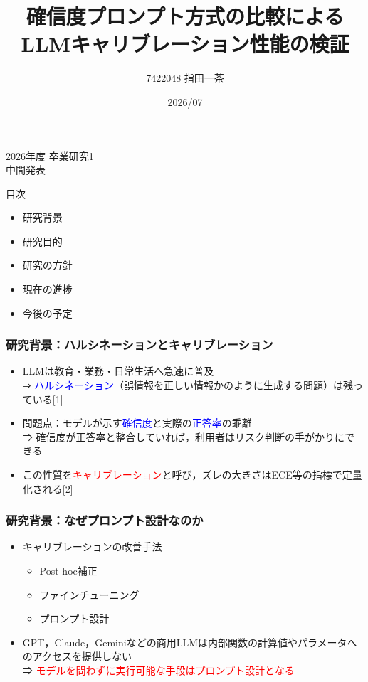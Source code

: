 \documentclass[dvipdfmx]{beamer}
\title[Issa Sashida. All Rights Reserved.]{確信度プロンプト方式の比較による\\LLMキャリブレーション性能の検証}
\author[\hspace{64pt} Copyright (C) 2026]{7422048 \quad 指田一茶}
\institute[]{グループE \quad 秦野研究室}
\date{2026/07}
\begin{document}
\begin{frame}
\vspace{5mm}
\begin{center}
\small{2026年度 卒業研究1 \\
中間発表
}
\end{center}
\titlepage
\end{frame}

\begin{frame}{目次}
\begin{itemize}
	\item 研究背景
	\item 研究目的
	\item 研究の方針
	\item 現在の進捗
	\item 今後の予定
\end{itemize}
\end{frame}

\begin{frame}
\frametitle{研究背景：ハルシネーションとキャリブレーション}
\begin{itemize}
	\item LLMは教育・業務・日常生活へ急速に普及
	\\⇒ \textcolor{blue}{ハルシネーション}（誤情報を正しい情報かのように生成する問題）は残っている[1]
	\vspace{10pt}
	\item 問題点：モデルが示す\textcolor{blue}{確信度}と実際の\textcolor{blue}{正答率}の乖離
	\\⇒ 確信度が正答率と整合していれば，利用者はリスク判断の手がかりにできる
	\vspace{10pt}
	\item この性質を\textcolor{red}{キャリブレーション}と呼び，ズレの大きさはECE等の指標で定量化される[2]
\end{itemize}
\end{frame}

\begin{frame}
\frametitle{研究背景：なぜプロンプト設計なのか}
\begin{itemize}
	\item キャリブレーションの改善手法
	\begin{itemize}
		\item Post-hoc補正
		\item ファインチューニング
		\item プロンプト設計
	\end{itemize}
	\vspace{10pt}
	\item GPT，Claude，Geminiなどの商用LLMは内部関数の計算値やパラメータへのアクセスを提供しない
	\\⇒ \textcolor{red}{モデルを問わずに実行可能な手段はプロンプト設計となる}
\end{itemize}
\end{frame}
\end{document}
